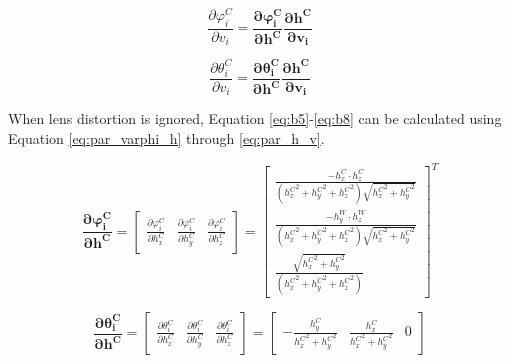 \begin{equation}
\label{eq:b7}
\frac{\partial \varphi _{i}^{C}}{\partial v_{i}}=
\boldsymbol{\frac{\partial \varphi _{i}^{C}}{\partial h^{C}}\frac{\partial h^{C}}{\partial v_{i}}}
\end{equation}

\begin{equation}
\label{eq:b8}
\frac{\partial \theta _{i}^{C}}{\partial v_{i}}=
\boldsymbol{\frac{\partial \theta_{i}^{C}}{\partial h^{C}}\frac{\partial h^{C}}{\partial v_{i}}}
\end{equation}

\noindent When lens distortion is ignored,
Equation \ref{eq:b5}-\ref{eq:b8} can be calculated using Equation
\ref{eq:par_varphi_h} through \ref{eq:par_h_v}.

\begin{equation}
\label{eq:par_varphi_h}
\boldsymbol{\frac{\partial \varphi_{i}^{C}}{\partial h^{C}}}= 
\begin{bmatrix}
\frac{\partial \varphi_{i}^{C}}{\partial h_{x}^{C}} & 
\frac{\partial \varphi_{i}^{C}}{\partial h_{y}^{C}} & 
\frac{\partial \varphi_{i}^{C}}{\partial h_{z}^{C}}
\end{bmatrix}=\begin{bmatrix}
\frac{-h_{x}^{C}\cdot h_{z}^{C}}{({h_{x}^{C}}^{2}+{h_{y}^{C}}^{2}+{h_{z}^{C}}^{2})\sqrt{{h_{x}^{C}}^{2}+{h_{y}^{C}}^{2}}} \\
\frac{-h_{y}^{W}\cdot h_{z}^{W}}{({h_{x}^{C}}^{2}+{h_{y}^{C}}^{2}+{h_{z}^{C}}^{2})\sqrt{{h_{x}^{C}}^{2}+{h_{y}^{C}}^{2}}} \\
\frac{\sqrt{{h_{x}^{C}}^{2}+{h_{y}^{C}}^{2}}}{({h_{x}^{C}}^{2}+{h_{y}^{C}}^{2}+{h_{z}^{C}}^{2})}
\end{bmatrix}^{T}
\end{equation}

\begin{equation}
\label{eq:par_theta_h}
\boldsymbol{\frac{\partial \theta_{i}^{C}}{\partial h^{C}}}=\begin{bmatrix}
\frac{\partial \theta_{i}^{C}}{\partial h_{x}^{C}} & 
\frac{\partial \theta_{i}^{C}}{\partial h_{y}^{C}} & 
\frac{\partial \theta_{i}^{C}}{\partial h_{z}^{C}} \end{bmatrix}
=\begin{bmatrix}
-\frac{h_{y}^{C}}{{h_{x}^{C}}^{2}+{h_{y}^{C}}^{2}} & 
\frac{h_{x}^{C}}{{h_{x}^{C}}^{2}+{h_{y}^{C}}^{2}} & 0
\end{bmatrix}
\end{equation}

